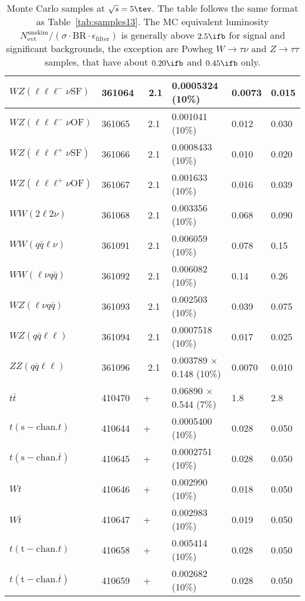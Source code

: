 \begin{table}[htbp]
\begin{center}
\begin{tabular}{l|l|l|l|l|l}
    			$ WZ (\ell\ell\ell^{-}\nu \mathrm{SF}) $ & 361064 & \Sherpa\ 2.1 & 0.0005324 (10\%)  & 0.0073 & 0.015 \\\hline
    			$ WZ (\ell\ell\ell^{-}\nu \mathrm{OF}) $ & 361065 & \Sherpa\ 2.1 & 0.001041 (10\%)  & 0.012 & 0.030 \\\hline
    			$ WZ (\ell\ell\ell^{+}\nu \mathrm{SF}) $ & 361066 & \Sherpa\ 2.1 & 0.0008433 (10\%)  & 0.010 & 0.020 \\\hline
    			$ WZ (\ell\ell\ell^{+}\nu \mathrm{OF}) $ & 361067 & \Sherpa\ 2.1 & 0.001633 (10\%)  & 0.016 & 0.039 \\\hline
    			$ WW (2\ell2\nu) $ & 361068 & \Sherpa\ 2.1 & 0.003356 (10\%)  & 0.068 & 0.090 \\\hline
    			$ WW (q\bar{q}\ell\nu) $ & 361091 & \Sherpa\ 2.1 & 0.006059 (10\%)  & 0.078 & 0.15 \\\hline
    			$ WW (\ell\nu q\bar{q}) $ & 361092 & \Sherpa\ 2.1 & 0.006082 (10\%)  & 0.14 & 0.26 \\\hline
    			$ WZ (\ell\nu q\bar{q}) $ & 361093 & \Sherpa\ 2.1 & 0.002503 (10\%)  & 0.039 & 0.075 \\\hline
    			$ WZ (q\bar{q}\ell\ell) $ & 361094 & \Sherpa\ 2.1 & 0.0007518 (10\%)  & 0.017 & 0.025 \\\hline
    			$ ZZ (q\bar{q}\ell\ell) $ & 361096 & \Sherpa\ 2.1 & 0.003789 $\times$ 0.148 (10\%)  & 0.0070 & 0.010 \\\hline
    			\hline
    			$ t\bar{t} $ & 410470 & \Powheg+\Pythia & 0.06890 $\times$ 0.544 (7\%)  & 1.8 & 2.8 \\\hline
    			$ t (\mathrm{s-chan.} t) $ & 410644 & \Powheg+\Pythia & 0.0005400 (10\%)  & 0.028 & 0.050 \\\hline
    			$ t (\mathrm{s-chan.} \bar{t}) $ & 410645 & \Powheg+\Pythia & 0.0002751 (10\%)  & 0.028 & 0.050 \\\hline
    			$ Wt $ & 410646 & \Powheg+\Pythia & 0.002990 (10\%)  & 0.018 & 0.050 \\\hline
    			$ W\bar{t} $ & 410647 & \Powheg+\Pythia & 0.002983 (10\%)  & 0.019 & 0.050 \\\hline
    			$ t (\mathrm{t-chan.} t) $ & 410658 & \Powheg+\Pythia & 0.005414 (10\%)  & 0.028 & 0.050 \\\hline
    			$ t (\mathrm{t-chan.} \bar{t}) $ & 410659 & \Powheg+\Pythia & 0.002682 (10\%)  & 0.028 & 0.050 \\\hline\hline
    		\end{tabular}
    		\caption{Monte Carlo samples at $\sqrt{s} = 5\tev$. The table
    			follows the same format as Table~\ref{tab:samples13}. The MC equivalent
    			luminosity
    			$N^\mathrm{unskim}_\mathrm{evt}/(\sigma{\cdot}\text{BR}{\cdot}\epsilon_\mathrm{filter})$
    			is generally above $2.5\ifb$ for signal and significant
    			backgrounds, the exception are Powheg $W\to\tau\nu$ and
    			$Z\to\tau\tau$ samples, that have about $0.20\ifb$ and $0.45\ifb$ only.}
    		\label{tab:samples5}
    	\end{center}
    \end{table}
    \clearpage

